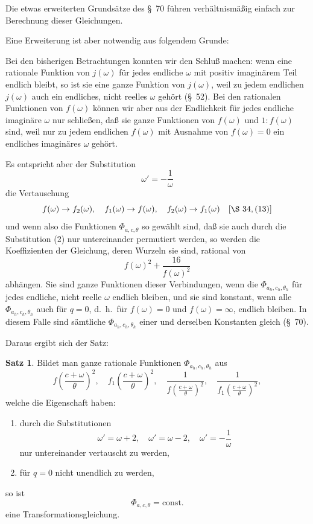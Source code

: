 \documentclass[12pt,a4paper]{article}
\theoremstyle{definition}
\newtheorem*{satz}{Satz}
\begin{document}
Die etwas erweiterten Grundsätze des \S\ 70 führen verhältnismäßig einfach zur Berechnung dieser Gleichungen.

Eine Erweiterung ist aber notwendig aus folgendem Grunde:

Bei den bisherigen Betrachtungen konnten wir den Schluß machen: wenn eine rationale Funktion von $j(\omega)$ für jedes endliche $\omega$ mit positiv imaginärem Teil endlich bleibt, so ist sie eine ganze Funktion von $j(\omega)$, weil zu jedem endlichen $j(\omega)$ auch ein endliches, nicht reelles $\omega$ gehört (\S\ 52). Bei den rationalen Funktionen von $f(\omega)$ können wir aber aus der Endlichkeit für jedes endliche imaginäre $\omega$ nur schließen, daß sie ganze Funktionen von $f(\omega)$ und $1:f(\omega)$ sind, weil nur zu jedem endlichen $f(\omega)$ mit Ausnahme von $f(\omega) = 0$ ein endliches imaginäres $\omega$ gehört.

Es entspricht aber der Substitution
\begin{equation}\label{eq:73-2}
\omega' = -\frac{1}{\omega}
\end{equation}
die Vertauschung
\[
f(\omega) \to f_2(\omega), \quad f_1(\omega) \to f(\omega), \quad f_2(\omega) \to f_1(\omega) \quad [\S\ 34, (13)]
\]
und wenn also die Funktionen $\Phi_{a,c,\theta}$ so gewählt sind, daß sie auch durch die Substitution (2) nur untereinander permutiert werden, so werden die Koeffizienten der Gleichung, deren Wurzeln sie sind, rational von
\[
f(\omega)^2 + \frac{16}{f(\omega)^2}
\]
abhängen. Sie sind ganze Funktionen dieser Verbindungen, wenn die $\Phi_{a_h,c_h,\theta_h}$ für jedes endliche, nicht reelle $\omega$ endlich bleiben, und sie sind konstant, wenn alle $\Phi_{a_h,c_h,\theta_h}$ auch für $q = 0$, d.~h.\ für $f(\omega) = 0$ und $f(\omega) = \infty$, endlich bleiben. In diesem Falle sind sämtliche $\Phi_{a_h,c_h,\theta_h}$ einer und derselben Konstanten gleich (\S\ 70).

Daraus ergibt sich der Satz:

\begin{satz}
Bildet man ganze rationale Funktionen $\Phi_{a_h,c_h,\theta_h}$ aus
\[
f\left(\frac{c + \omega}{\theta}\right)^2, \quad f_1\left(\frac{c + \omega}{\theta}\right)^2, \quad \frac{1}{f\left(\frac{c + \omega}{\theta}\right)^2}, \quad \frac{1}{f_1\left(\frac{c + \omega}{\theta}\right)^2},
\]
welche die Eigenschaft haben:
\begin{enumerate}[label=\arabic*.]
\item durch die Substitutionen
\[
\omega' = \omega + 2, \quad \omega' = \omega - 2, \quad \omega' = -\frac{1}{\omega}
\]
nur untereinander vertauscht zu werden,
\item für $q = 0$ nicht unendlich zu werden,
\end{enumerate}
so ist
\[
\Phi_{a,c,\theta} = \text{const.}
\]
eine Transformationsgleichung.
\end{satz}
\end{document}
